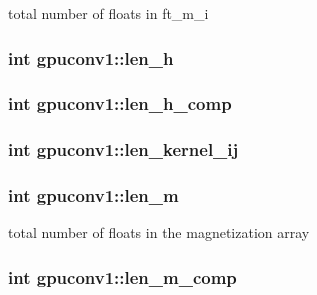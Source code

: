 total number of floats in ft\_\-m\_\-i 

\hypertarget{structgpuconv1_a063cfdc7c24a54f6596bcc3686c40e9d}{
\subsubsection[{len\_\-h}]{\setlength{\rightskip}{0pt plus 5cm}int {\bf gpuconv1::len\_\-h}}}
\label{structgpuconv1_a063cfdc7c24a54f6596bcc3686c40e9d}
\hypertarget{structgpuconv1_a7d431198998824f866b4285a3c236630}{
\subsubsection[{len\_\-h\_\-comp}]{\setlength{\rightskip}{0pt plus 5cm}int {\bf gpuconv1::len\_\-h\_\-comp}}}
\label{structgpuconv1_a7d431198998824f866b4285a3c236630}
\hypertarget{structgpuconv1_a4108710634b2adb26110224f97016135}{
\subsubsection[{len\_\-kernel\_\-ij}]{\setlength{\rightskip}{0pt plus 5cm}int {\bf gpuconv1::len\_\-kernel\_\-ij}}}
\label{structgpuconv1_a4108710634b2adb26110224f97016135}
\hypertarget{structgpuconv1_ae27934e56185491eac926153abc81d53}{
\subsubsection[{len\_\-m}]{\setlength{\rightskip}{0pt plus 5cm}int {\bf gpuconv1::len\_\-m}}}
\label{structgpuconv1_ae27934e56185491eac926153abc81d53}


total number of floats in the magnetization array 

\hypertarget{structgpuconv1_a75c95abdb09599057d8f79398410f6f4}{
\subsubsection[{len\_\-m\_\-comp}]{\setlength{\rightskip}{0pt plus 5cm}int {\bf gpuconv1::len\_\-m\_\-comp}}}
\label{structgpuconv1_a75c95abdb09599057d8f79398410f6f4}


